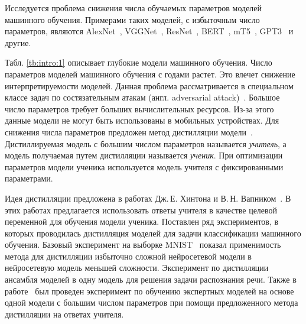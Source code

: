 Исследуется проблема снижения числа обучаемых параметров моделей машинного обучения. Примерами таких моделей, с избыточным число параметров, являются AlexNet~\cite{Krizhevsky2012}, VGGNet~\cite{Simonyan2014}, ResNet~\cite{Kaiming2015}, BERT~\cite{Devlin2018, Vaswani2017}, mT5~\cite{Linting2021}, GPT3~\cite{Brown2020} и другие.
\begin{table}[h!]
\caption{Анализ роста числа параметров при развитии моделей глубокого обучения}
\label{tb:intro:1}
\begin{center}
\end{center}
\end{table}
Табл. \ref{tb:intro:1} описывает глубокие модели машинного обучения.
Число параметров моделей машинного обучения с годами растет.
Это влечет снижение интерпретируемости моделей.
Данная проблема рассматривается в специальном классе задач по состязательным атакам (англ. adversarial attack)~\cite{Zheng2020}.
Большое число параметров требует больших вычислительных ресурсов.
Из-за этого данные модели не могут быть использованы в мобильных устройствах.
Для снижения числа параметров предложен метод дистилляции модели~\cite{Hinton2015, Vapnik2015, Lopez2016}.
Дистиллируемая модель с большим числом параметров называется \textit{учитель}, а модель получаемая путем дистилляции называется \textit{ученик}.
При оптимизации параметров модели ученика используется модель учителя с фиксированными параметрами.

Идея дистилляции предложена в работах Дж.\,Е. Хинтона и В.\,Н. Вапником~\cite{Hinton2015, Vapnik2015, Lopez2016}. В этих работах предлагается использовать ответы учителя в качестве целевой переменной для обучения модели ученика.
Поставлен ряд экспериментов, в которых проводилась дистилляция моделей для задачи классификации машинного обучения.
Базовый эксперимент на выборке MNIST~\cite{mnist} показал применимость метода для дистилляции избыточно сложной нейросетевой модели в нейросетевую модель меньшей сложности.
Эксперимент по дистилляции ансамбля моделей в одну модель для решения задачи распознания речи. Также в работе~\cite{Hinton2015} был проведен эксперимент по обучению экспертных моделей на основе одной модели с большим числом параметров при помощи предложенного метода дистилляции на ответах учителя.

